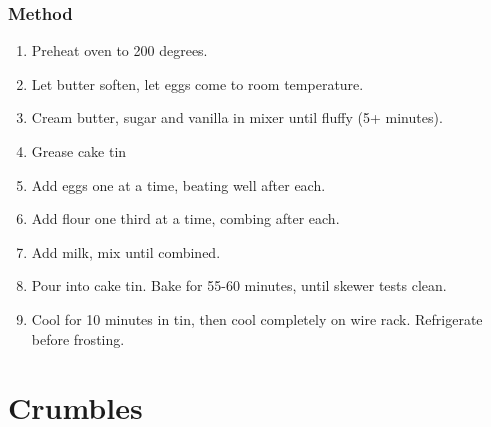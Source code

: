 \documentclass[]{article}
\begin{document}
\subsubsection*{\Large Method}
\begin{enumerate}[font=\huge\color{accent}]
	\item Preheat oven to 200 degrees.
	\item Let butter soften, let eggs come to room temperature.
	\item Cream butter, sugar and vanilla in mixer until fluffy (5+ minutes).
	\item Grease cake tin
	\item Add eggs one at a time, beating well after each.
	\item Add flour one third at a time, combing after each.
	\item Add milk, mix until combined.
	\item Pour into cake tin. Bake for 55-60 minutes, until skewer tests clean.
	\item Cool for 10 minutes in tin, then cool completely on wire rack. Refrigerate before frosting.
\end{enumerate}
\newpage
{}
\section*{\center\Huge\color{accent}Crumbles}
\label{cat:Crumbles}
\label{rec:Apple Crumble}
\end{document}
